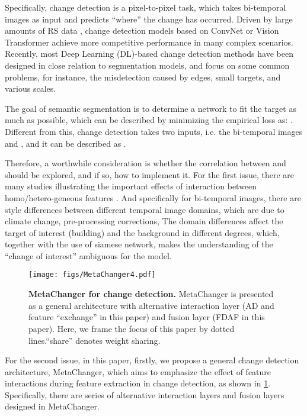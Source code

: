 \documentclass[10pt,twocolumn,letterpaper]{article}
\begin{document}
Specifically, change detection is a pixel-to-pixel task, which takes bi-temporal images as input and predicts ``where'' the change has occurred. Driven by large amounts of RS data \cite{toker2022dynamicearthnet, shen2021s2looking, verma2021qfabric}, change detection models based on ConvNet or Vision Transformer achieve more competitive performance in many complex scenarios. Recently, most Deep Learning (DL)-based change detection methods have been designed in close relation to segmentation models, and focus on some common problems, for instance, the misdetection caused by edges, small targets, and various scales.


The goal of semantic segmentation is to determine a network to fit the target  as much
as possible, which can be described by minimizing the empirical loss as: . Different from this, change detection takes two inputs, i.e. the bi-temporal images  and , and it can be described as .

Therefore, a worthwhile consideration is whether the correlation between  and  should be explored, and if so, how to implement it. For the first issue, there are many studies illustrating the important effects of interaction between homo/hetero-geneous features \cite{wang2020deep, zhang2022lightweight}. And specifically for bi-temporal images, there are style differences between different temporal image domains, which are due to climate change, pre-processing corrections, \etc The domain differences affect the target of interest (\eg building) and the background in different degrees, which, together with the use of siamese network, makes the understanding of the ``change of interest'' ambiguous for the model. 





\begin{figure}[t]
  \centering
\texttt{[image: figs/MetaChanger4.pdf]}

   \caption{\textbf{MetaChanger for change detection.} MetaChanger is presented as a general architecture with alternative interaction layer (\eg AD and feature ``exchange'' in this paper) and fusion layer (\eg FDAF in this paper). Here, we frame the focus of this paper by dotted lines.``share'' denotes weight sharing.}
\label{fig:MetaChanger}
\end{figure}

For the second issue, in this paper, firstly, we propose a general change detection architecture, MetaChanger, which aims to emphasize the effect of feature interactions during feature extraction in change detection, as shown in \cref{fig:MetaChanger}. Specifically, there are series of alternative interaction layers and fusion layers designed in MetaChanger.
\end{document}
